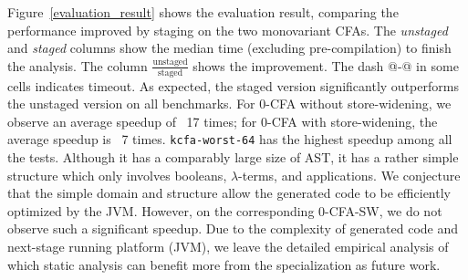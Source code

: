Figure~\ref{evaluation_result} shows the evaluation result, comparing the
performance improved by staging on the two monovariant CFAs. The
\textit{unstaged} and \textit{staged} columns show the median time (excluding
pre-compilation) to finish the analysis. The column
$\frac{\text{unstaged}}{\text{staged}}$ shows the improvement. The dash @-@ in
some cells indicates timeout.  As expected, the staged version significantly
outperforms the unstaged version on all benchmarks.
For 0-CFA without store-widening, we observe an average speedup of ~17 times;
for 0-CFA with store-widening, the average speedup is ~7 times.
\texttt{kcfa-worst-64} has the highest speedup among all the tests. Although it
has a comparably large size of AST, it has a rather simple structure which only
involves booleans, $\lambda$-terms, and applications. We conjecture that the simple
domain and structure allow the generated code to be efficiently optimized by the
JVM. However, on the corresponding 0-CFA-SW, we do not observe such a significant
speedup. Due to the complexity of generated code and next-stage running platform
(JVM), we leave the detailed empirical analysis of which static analysis can
benefit more from the specialization as future work.



